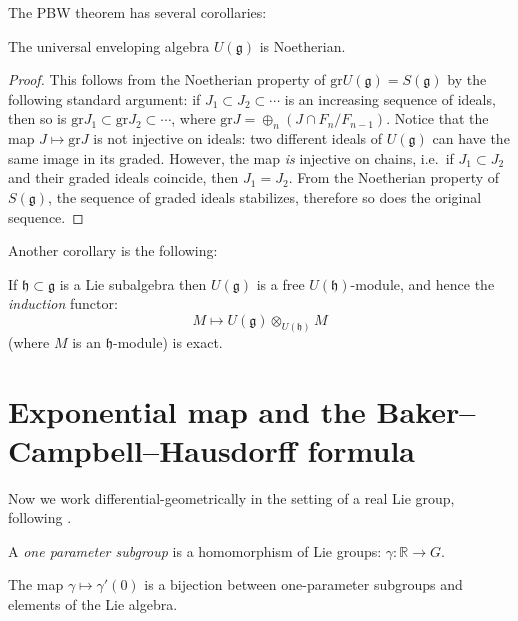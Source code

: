 The PBW theorem has several corollaries:

\begin{proposition}
\label{proposition-Ug-Noetherian}
The universal enveloping algebra $U(\mathfrak g)$ is Noetherian.
\end{proposition}

\begin{proof}
This follows from the Noetherian property of $\text{gr} U(\mathfrak g) = S(\mathfrak g)$ by the following standard argument: if $J_1\subset J_2 \subset \cdots $ is an increasing sequence of ideals, then so is $\text{gr} J_1\subset \text{gr} J_2 \subset \cdots$, where $\text{gr} J = \oplus_n (J\cap F_n/F_{n-1})$. Notice that the map $J\mapsto \text{gr} J$ is not injective on ideals: two different ideals of $U(\mathfrak g)$ can have the same image in its graded. However, the map \emph{is} injective on chains, i.e.\ if $J_1\subset J_2$ and their graded ideals coincide, then $J_1=J_2$. From the Noetherian property of $S(\mathfrak g)$, the sequence of graded ideals stabilizes, therefore so does the original sequence.
\end{proof}

Another corollary is the following:

\begin{proposition}
\label{proposition-induction-exact}
 If $\mathfrak h\subset\mathfrak g$ is a Lie subalgebra then $U(\mathfrak g)$ is a free $U(\mathfrak h)$-module, and hence the \emph{induction} functor:
$$ M\mapsto U(\mathfrak g)\otimes_{U(\mathfrak h)} M$$
(where $M$ is an $\mathfrak h$-module) is exact. 
\end{proposition}





\section{Exponential map and the Baker--Campbell--Hausdorff formula}
\label{section-exponentialmap}

Now we work differential-geometrically in the setting of a real Lie group, following \cite{Sternberg}. 

\begin{definition}
\label{definition-oneparameter-subgroup}
 A {\it one parameter subgroup} is a homomorphism of Lie groups: $\gamma:\mathbb R\to G$. 
\end{definition}


\begin{lemma}
\label{lemma-oneparameter}
 The map $\gamma\mapsto \gamma'(0)$ is a bijection between one-parameter subgroups and elements of the Lie algebra.
\end{lemma}

